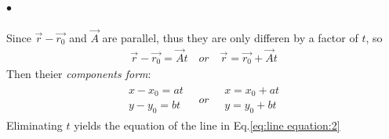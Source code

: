             \paragraph{$\bullet$} Since $\vec{r} -\vec{r_0}$ and $\vec{A}$ are parallel, thus they are only differen 
            by a factor of $t$, so
            \begin{align}
                \label{eq:r and A equivlent}
                \vec{r} -\vec{r_0} = \vec{A} t \quad or \quad \vec{r} = \vec{r_0} + \vec{A} t
            \end{align}
            Then theier \textit{components form}:
            \begin{align}
                \begin{aligned}
                    x - x_0 = at \\
                    y - y_0 = bt
                \end{aligned} \quad or \quad
                \begin{aligned}
                    x = x_0 + at \\
                    y = y_0 + bt
                \end{aligned}
            \end{align}
            Eliminating $t$ yields the equation of the line in Eq.\eqref{eq:line equation:2}
            

